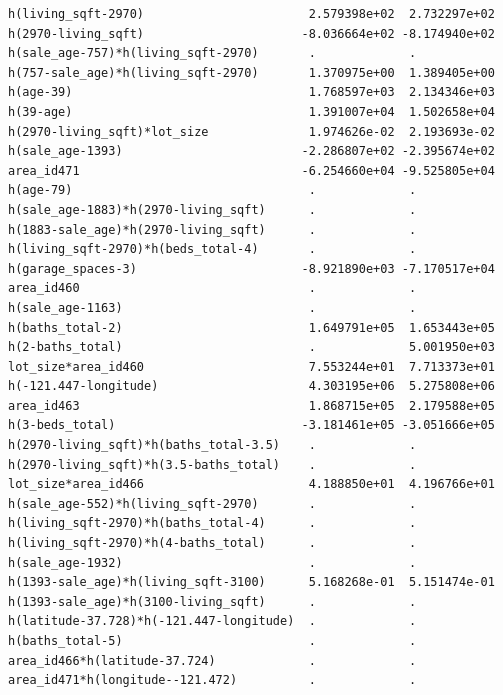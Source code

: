 \documentclass[
]{article}
\begin{document}
\begin{verbatim}
h(living_sqft-2970)                       2.579398e+02  2.732297e+02
h(2970-living_sqft)                      -8.036664e+02 -8.174940e+02
h(sale_age-757)*h(living_sqft-2970)       .             .           
h(757-sale_age)*h(living_sqft-2970)       1.370975e+00  1.389405e+00
h(age-39)                                 1.768597e+03  2.134346e+03
h(39-age)                                 1.391007e+04  1.502658e+04
h(2970-living_sqft)*lot_size              1.974626e-02  2.193693e-02
h(sale_age-1393)                         -2.286807e+02 -2.395674e+02
area_id471                               -6.254660e+04 -9.525805e+04
h(age-79)                                 .             .           
h(sale_age-1883)*h(2970-living_sqft)      .             .           
h(1883-sale_age)*h(2970-living_sqft)      .             .           
h(living_sqft-2970)*h(beds_total-4)       .             .           
h(garage_spaces-3)                       -8.921890e+03 -7.170517e+04
area_id460                                .             .           
h(sale_age-1163)                          .             .           
h(baths_total-2)                          1.649791e+05  1.653443e+05
h(2-baths_total)                          .             5.001950e+03
lot_size*area_id460                       7.553244e+01  7.713373e+01
h(-121.447-longitude)                     4.303195e+06  5.275808e+06
area_id463                                1.868715e+05  2.179588e+05
h(3-beds_total)                          -3.181461e+05 -3.051666e+05
h(2970-living_sqft)*h(baths_total-3.5)    .             .           
h(2970-living_sqft)*h(3.5-baths_total)    .             .           
lot_size*area_id466                       4.188850e+01  4.196766e+01
h(sale_age-552)*h(living_sqft-2970)       .             .           
h(living_sqft-2970)*h(baths_total-4)      .             .           
h(living_sqft-2970)*h(4-baths_total)      .             .           
h(sale_age-1932)                          .             .           
h(1393-sale_age)*h(living_sqft-3100)      5.168268e-01  5.151474e-01
h(1393-sale_age)*h(3100-living_sqft)      .             .           
h(latitude-37.728)*h(-121.447-longitude)  .             .           
h(baths_total-5)                          .             .           
area_id466*h(latitude-37.724)             .             .           
area_id471*h(longitude--121.472)          .             .           
                                                                    

\end{verbatim}
\end{document}
